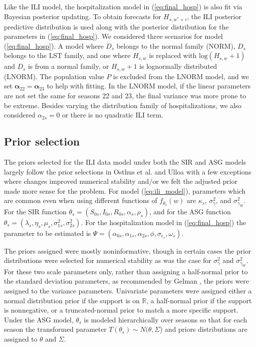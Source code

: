 Like the ILI model, the hospitalization model in (\ref{eq:final_hosp}) is also 
fit via Bayesian posterior updating. To obtain forecasts for $H_{s, w^* + i}$, 
the ILI posterior predictive distribution is used along with the posterior 
distribution for the parameters in (\ref{eq:final_hosp}). We considered three 
scenarios for model (\ref{eq:final_hosp}). A model where $D_s$ belongs to the 
normal family (NORM), $D_s$ belongs to the LST family, and one where $H_{s,w}$ 
is replaced with $\text{log}(H_{s,w} + 1)$ and $D_s$ is from a normal family, 
or $H_{s,w} + 1$ is lognormally distributed (LNORM). The population value $P$ 
is excluded from the LNORM model, and we set 
$\boldsymbol{\alpha}_{22} = \boldsymbol{\alpha}_{23}$ to help with fitting. In 
the LNORM model, if the linear parameters are not set the same for seasons 22 
and 23, the final variance was more prone to be extreme. Besides varying the 
distribution family of hospitalizations, we also considered $\alpha_{2s} = 0$ 
or there is no quadratic ILI term.


\subsection{Prior selection}


The priors selected for the ILI data model under both the SIR and ASG models 
largely follow the prior selections in Osthus et al. \cite[]{osthus2019dynamic} 
and Ulloa \cite[]{ulloa2019} with a few exceptions where changes improved 
numerical stability and/or we felt the adjusted prior made more sense for the 
problem. For model (\ref{eq:ili_model}), parameters which are common even when 
using different functions of $f_{\theta_s}(w)$ are $\kappa_s$, 
$\sigma_{\gamma}^2$, and $\sigma_{\gamma_W}^2$. For the SIR function 
$\theta_s = (S_{0s}, I_{0s}, R_{0s}, \alpha_s, \rho_s)$, and for the ASG 
function $\theta_s = (\lambda_s, \eta_s, \mu_s, \sigma_{1s}^2, \sigma_{2s}^2)$. 
For the hospitalization model in (\ref{eq:final_hosp}) the parameter to be 
estimated is $\Psi = (\alpha_{0s}, \alpha_{1s}, \alpha_{2s}, \phi, \sigma_{\epsilon_s}, \omega_s)$. 


The priors assigned were mostly noninformative, though in certain cases the 
prior distributions were selected for numerical stability as was the case 
for $\sigma_{\gamma}^2$ and $\sigma_{\gamma_W}^2$. For these two scale 
parameters only, rather than assigning a half-normal prior to the standard 
deviation parameters, as recommended by Gelman \cite[]{gelman2006prior}, the 
priors were assigned to the variance parameters. Univariate parameters were 
assigned either a normal distribution prior if the support is on $\mathbb{R}$, 
a half-normal prior if the support is nonnegative, or a truncated-normal 
prior to match a more specific support. Under the ASG model, $\theta_s$ is 
modeled hierarchically over seasons so that for each season the transformed 
parameter $T(\theta_s) \sim N(\theta, \Sigma$) and priors distributions are 
assigned to $\theta$ and $\Sigma$.



